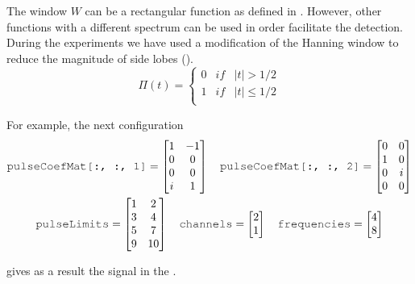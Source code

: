The window $W$ can be a rectangular function as defined in . However, other functions with a different spectrum can be used in order facilitate the detection. During the experiments we have used a modification of the Hanning window to reduce the magnitude of side lobes ().
\begin{equation}
\Pi(t) = \left\{ \begin{array}{lcc}
0 &   if  & |t| > 1/2 \\
1 &  if & |t| \leq 1/2 \\
\end{array} \right.
\label{rectFunc}
\end{equation}


For example, the next configuration
\begin{gather*}
\text{\variable{pulseCoefMat[:, :, 1]}} = 
\begin{bmatrix}
	1 & -1 \\
	0 & 0 \\
	0 & 0 \\
	i & 1 \\
\end{bmatrix}
\quad
\text{\variable{pulseCoefMat[:, :, 2]}} = 
\begin{bmatrix}
	0 & 0 \\
	1 & 0 \\
	0 & i \\
	0 & 0 \\
\end{bmatrix}\\
\text{\variable{pulseLimits}} =
\begin{bmatrix}
	1 & 2 \\
	3 & 4 \\
	5 & 7 \\
	9 & 10 \\
\end{bmatrix}
\quad
\text{\variable{channels}} =
\begin{bmatrix}
	2 \\
	1 \\
\end{bmatrix}
\quad
\text{\variable{frequencies}} =
\begin{bmatrix}
	4 \\
	8 \\
\end{bmatrix}
\end{gather*}

gives as a result the signal in the .

